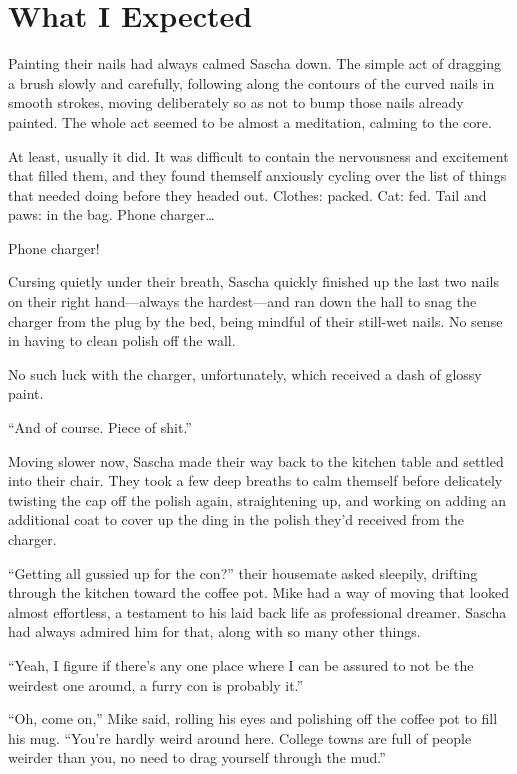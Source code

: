 \chapter{What I Expected}

Painting their nails had always calmed Sascha down. The simple act of dragging a brush slowly and carefully, following along the contours of the curved nails in smooth strokes, moving deliberately so as not to bump those nails already painted. The whole act seemed to be almost a meditation, calming to the core.

At least, usually it did. It was difficult to contain the nervousness and excitement that filled them, and they found themself anxiously cycling over the list of things that needed doing before they headed out. Clothes: packed. Cat: fed. Tail and paws: in the bag. Phone charger\ldots{}

Phone charger!

Cursing quietly under their breath, Sascha quickly finished up the last two nails on their right hand---always the hardest---and ran down the hall to snag the charger from the plug by the bed, being mindful of their still-wet nails. No sense in having to clean polish off the wall.

No such luck with the charger, unfortunately, which received a dash of glossy paint.

``And of course. Piece of shit.''

Moving slower now, Sascha made their way back to the kitchen table and settled into their chair. They took a few deep breaths to calm themself before delicately twisting the cap off the polish again, straightening up, and working on adding an additional coat to cover up the ding in the polish they'd received from the charger.

``Getting all gussied up for the con?'' their housemate asked sleepily, drifting through the kitchen toward the coffee pot. Mike had a way of moving that looked almost effortless, a testament to his laid back life as professional dreamer. Sascha had always admired him for that, along with so many other things.

``Yeah, I figure if there's any one place where I can be assured to not be the weirdest one around, a furry con is probably it.''

``Oh, come on,'' Mike said, rolling his eyes and polishing off the coffee pot to fill his mug. ``You're hardly weird around here. College towns are full of people weirder than you, no need to drag yourself through the mud.''

